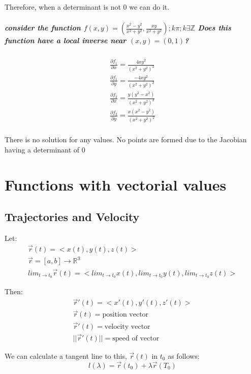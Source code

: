 \documentclass[11pt,fleqn]{book} %
\begin{document}
Therefore, when a determinant is not 0 we can do it.

\paragraph{consider the function $f(x,y)=(\frac{x^2-y^2}{x^2+y^2}, \frac{xy}{x^2 + y^2}) ; k \pi ; k \exists \mathbb{Z} $
Does this function have a local inverse near $(x,y) = (0,1)$?}

\begin{gather}
    \frac{\partial f_1}{\partial x} = \frac{4xy^2}{(x^2+y^2)^2}\\
    \frac{\partial f_1}{\partial y} = \frac{-4xy^2}{(x^2+y^2)^2} \\
    \frac{\partial f_2}{\partial x} = \frac{y(y^2-x^2)}{(x^2+y^2)^2}\\
    \frac{\partial f_2}{\partial y} = \frac{x(x^2-y^2)}{(x^2+y^2)^2} \\
\end{gather}

There is no solution for any values. No points are formed due to the Jacobian having a determinant of 0

\chapter{Functions with vectorial values}

\section{Trajectories and Velocity}
Let:
\begin{gather}
    \vec{r}(t) = <x(t), y(t), z(t)>\\
    \vec{r} = [a,b] \to \mathbb{R^3} \\
    lim_{t \to t_0} \vec{r}(t) = <lim_{t \to t_0}x(t), lim_{t \to t_0}y(t), lim_{t \to t_0}z(t)>
\end{gather}

Then:
\begin{gather}
    \vec{r}'(t) =  <x'(t), y'(t), z'(t)>\\
    \vec{r}(t) = \text{position vector}\\
    \vec{r}'(t) = \text{velocity vector}\\
    ||\vec{r}'(t)||=\text{speed of vector}
\end{gather}

We can calculate a tangent line to this, $\vec{r}(t)$ in $t_0$ as follows:
\begin{equation}
    l(\lambda) = \vec{r}(t_0) + \lambda \vec{r}(T_0)
\end{equation}
\end{document}
